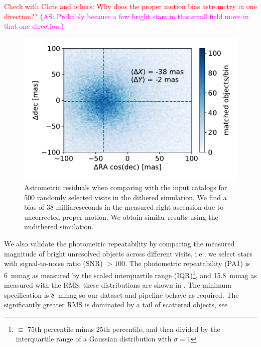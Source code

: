 \documentclass[twocolumn]{aastex62}
\newcommand{\as}[1]{{\textcolor{magenta}{{\textbf (AS: #1)}}}}
\begin{document}
\textcolor{red}{Check with Chris and others: Why does the proper motion bias astrometry in one direction??}
\as{Probably because a few bright stars in this small field move in that one direction.}

\begin{figure}
\centering
\includegraphics[width=0.9\columnwidth]{astrometric_residuals_single_visit_2d}
\caption{Astrometric residuals when comparing with the input catalogs for 500 randomly selected visits in the dithered simulation. We find a bias of 38 milliarcseconds in the measured right ascension due to uncorrected proper motion. We obtain similar results using the undithered simulation.}
\label{fig:AA1}
\end{figure}

We also validate the photometric repeatability by comparing the measured magnitude of bright unresolved objects across different visits, i.e., we select stars with signal-to-noise ratio (SNR) $> 100$. The photometric repeatability (PA1) is 6~mmag as measured by the scaled interquartile range (IQR)\footnote{$\equiv$ 75th percentile minus 25th percentile, and then divided by the interquartile range of a Gaussian distribution with $\sigma=1$}, and 15.8~mmag as measured with the RMS; these distributions are shown in . The minimum specification is 8~mmag so our dataset and pipeline behave as required. The significantly greater RMS is dominated by a tail of scattered objects, see .
\end{document}
